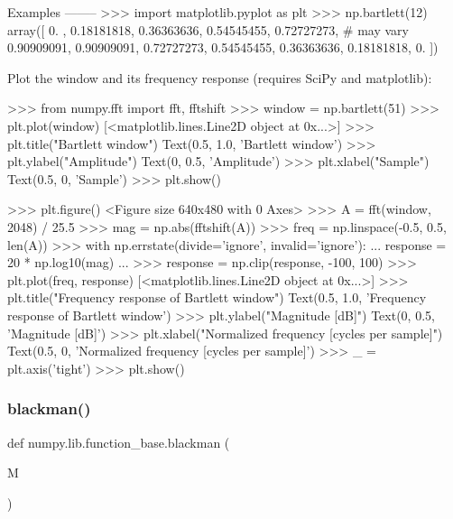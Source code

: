 \begin{DoxyVerb}
Examples
--------
>>> import matplotlib.pyplot as plt
>>> np.bartlett(12)
array([ 0.        ,  0.18181818,  0.36363636,  0.54545455,  0.72727273, # may vary
        0.90909091,  0.90909091,  0.72727273,  0.54545455,  0.36363636,
        0.18181818,  0.        ])

Plot the window and its frequency response (requires SciPy and matplotlib):

>>> from numpy.fft import fft, fftshift
>>> window = np.bartlett(51)
>>> plt.plot(window)
[<matplotlib.lines.Line2D object at 0x...>]
>>> plt.title("Bartlett window")
Text(0.5, 1.0, 'Bartlett window')
>>> plt.ylabel("Amplitude")
Text(0, 0.5, 'Amplitude')
>>> plt.xlabel("Sample")
Text(0.5, 0, 'Sample')
>>> plt.show()

>>> plt.figure()
<Figure size 640x480 with 0 Axes>
>>> A = fft(window, 2048) / 25.5
>>> mag = np.abs(fftshift(A))
>>> freq = np.linspace(-0.5, 0.5, len(A))
>>> with np.errstate(divide='ignore', invalid='ignore'):
...     response = 20 * np.log10(mag)
...
>>> response = np.clip(response, -100, 100)
>>> plt.plot(freq, response)
[<matplotlib.lines.Line2D object at 0x...>]
>>> plt.title("Frequency response of Bartlett window")
Text(0.5, 1.0, 'Frequency response of Bartlett window')
>>> plt.ylabel("Magnitude [dB]")
Text(0, 0.5, 'Magnitude [dB]')
>>> plt.xlabel("Normalized frequency [cycles per sample]")
Text(0.5, 0, 'Normalized frequency [cycles per sample]')
>>> _ = plt.axis('tight')
>>> plt.show()\end{DoxyVerb}
 \mbox{\label{namespacenumpy_1_1lib_1_1function__base_a0ad21c2f4a4c1666732e1958c22088db}} 
\subsubsection{\texorpdfstring{blackman()}{blackman()}}
{\footnotesize\ttfamily def numpy.\+lib.\+function\+\_\+base.\+blackman (\begin{DoxyParamCaption}\item[{}]{M }\end{DoxyParamCaption})}

